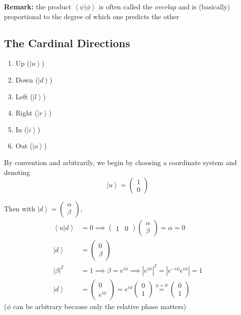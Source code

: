 \documentclass[12pt]{article}
\newcommand{\brak}[1]{\left\langle #1 \right\rangle}
\newcommand{\ket}[1]{\left\vert #1 \right\rangle}
\begin{document}
\textbf{Remark:} the product $\brak{\psi | \phi}$ is often called the \emph{overlap} and is (basically) proportional to the degree of which one predicts the other 

\subsection*{The Cardinal Directions}
\begin{enumerate}
    \item Up ($\ket{u}$)
    \item Down ($\ket{d}$)
    \item Left ($\ket{l}$)
    \item Right ($\ket{r}$)
    \item In ($\ket{i}$)
    \item Out ($\ket{o}$)
\end{enumerate}

By convention and arbitrarily, we begin by choosing a coordinate system and denoting 
\[\ket{u} = \begin{pmatrix}
    1\\0
\end{pmatrix}\]

Then with $\ket{d} = \begin{pmatrix}
    \alpha\\\beta
\end{pmatrix}$, 
\begin{align*}
    \brak{u | d} &= 0 \implies \begin{pmatrix}
        1 & 0
    \end{pmatrix} \begin{pmatrix}
        \alpha\\\beta
    \end{pmatrix} = \alpha = 0\\
    \ket{d} &= \begin{pmatrix}
        0\\ \beta
    \end{pmatrix}\\
    |\beta|^2 &= 1 \implies \beta = e^{i\phi} \implies |e^{i\phi}|^2 = |e^{-i\phi}e^{i\phi}| = 1\\
    \ket{d} &= \begin{pmatrix}
        0\\e^{i\phi} 
    \end{pmatrix} = e^{i\phi} \begin{pmatrix}
        0\\1
    \end{pmatrix} \overset{\phi = 0}{=} \begin{pmatrix}
        0\\1
    \end{pmatrix}
\end{align*}
($\phi$ can be arbitrary because only the relative phase matters)
\end{document}

